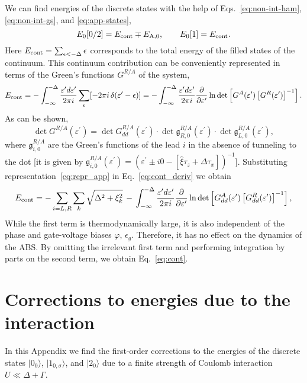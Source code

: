 \documentclass[aps,reprint,longbibliography, prb]{revtex4-2}
\begin{document}
We can find energies of the discrete states with the help of Eqs.~\eqref{eq:non-int-ham}, \eqref{eq:non-int-gs}, and \eqref{eq:app-states},
\begin{equation}
    E_0[0/2] = E_{\rm cont} \mp E_{\rm A,0},\quad\quad E_0[1] = E_{\rm cont}.
\end{equation}
Here $E_{\rm cont} = \sum_{\epsilon < - \Delta} \epsilon$ corresponds to the total energy of the filled states of the continuum. This continuum contribution can be conveniently represented in terms of the Green's functions $G^{R/A}$ of the system, 
\begin{equation}\label{eq:cont_deriv}
    E_{\rm cont} = - \int_{-\infty}^{-\Delta}\frac{\varepsilon^\prime d\varepsilon^\prime}{2\pi i} \sum_\epsilon [-2\pi i\,\delta(\varepsilon^\prime - \epsilon)] = -\int_{-\infty}^{-\Delta}\frac{\varepsilon^\prime d\varepsilon^\prime}{2\pi i} \frac{\partial}{\partial \varepsilon^\prime}\ln \det \left[G^A (\varepsilon^\prime) \left[G^R(\varepsilon^\prime)\right]^{-1}\right].
\end{equation}
As can be shown,
\begin{equation}\label{eq:repr_app}
    \det G^{R/A}(\varepsilon^\prime) = \det G^{R/A}_{dd}(\varepsilon^\prime) \cdot \det \mathfrak{g}^{R/A}_{R, 0}(\varepsilon^\prime) \cdot \det \mathfrak{g}^{R/A}_{L, 0}(\varepsilon^\prime),
\end{equation}
where $\mathfrak{g}^{R/A}_{i, 0}$ are the Green's functions of the lead $i$ in the absence of tunneling to the dot [it is given by $\mathfrak{g}^{R/A}_{i, 0}(\varepsilon^\prime) = (\varepsilon^\prime\pm i0 - [\hat{\xi}\tau_z + \Delta \tau_x])^{-1}$]. Substituting representation~\eqref{eq:repr_app} in Eq.~\eqref{eq:cont_deriv} we obtain
\begin{equation}
    E_{\rm cont} = -\sum_{i = L, R} \sum_k \sqrt{\Delta^2 + \xi_k^2} \,-\,\int_{-\infty}^{-\Delta}\frac{\varepsilon^\prime d\varepsilon^\prime}{2\pi i} \frac{\partial}{\partial \varepsilon^\prime}\ln \det \left[G_{dd}^A (\varepsilon^\prime) \left[G_{dd}^R(\varepsilon^\prime)\right]^{-1}\right],
\end{equation}
While the first term is thermodynamically large, it is also independent of the phase and gate-voltage biases $\varphi$, $\epsilon_g$. Therefore, it has no effect on the dynamics of the ABS. By omitting the irrelevant first term and performing integration by parts on the second term, we obtain Eq.~\eqref{eq:cont}.

\section{Corrections to energies due to the interaction}
\label{app:int}
In this Appendix we find the first-order corrections to the energies of the discrete states $|0_0\rangle$, $|1_{0,\sigma}\rangle$, and $|2_0\rangle$ due to a finite strength of Coulomb interaction $U \ll \Delta + \Gamma$.
\end{document}
